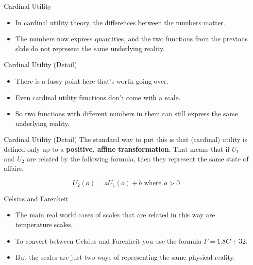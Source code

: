 \documentclass[
  14pt,
  letterpaper,
  ignorenonframetext,
  aspectratio=169,
  handout]{beamer}
\providecommand{\tightlist}{%
  \setlength{\itemsep}{0pt}\setlength{\parskip}{0pt}}\usepackage{longtable,booktabs,array}
\let\olditem\item
\renewcommand{\item}{%
\olditem\vspace{6pt}}
\begin{document}
\begin{frame}{Cardinal Utility}
\protect\hypertarget{cardinal-utility}{}
\begin{itemize}[<+->]
\tightlist
\item
  In cardinal utility theory, the differences between the numbers
  matter.
\item
  The numbers now express quantities, and the two functions from the
  previous slide do not represent the same underlying reality.
\end{itemize}
\end{frame}

\begin{frame}{Cardinal Utility (Detail)}
\protect\hypertarget{cardinal-utility-detail}{}
\begin{itemize}[<+->]
\tightlist
\item
  There is a fussy point here that's worth going over.
\item
  Even cardinal utility functions don't come with a scale.
\item
  So two functions with different numbers in them can still express the
  same underlying reality.
\end{itemize}
\end{frame}

\begin{frame}{Cardinal Utility (Detail)}
\protect\hypertarget{cardinal-utility-detail-1}{}
The standard way to put this is that (cardinal) utility is defined only
up to a \textbf{positive, affine transformation}. That means that if
\(U_1\) and \(U_2\) are related by the following formula, then they
represent the same state of affairs.

\[
U_2(o) = aU_1(o) + b \text{ where } a > 0
\]
\end{frame}

\begin{frame}{Celsius and Farenheit}
\protect\hypertarget{celsius-and-farenheit}{}
\begin{itemize}[<+->]
\tightlist
\item
  The main real world cases of scales that are related in this way are
  temperature scales.
\item
  To convert between Celsius and Farenheit you use the formula
  \(F = 1.8C + 32\).
\item
  But the scales are just two ways of representing the same physical
  reality.
\end{itemize}
\end{frame}
\end{document}
